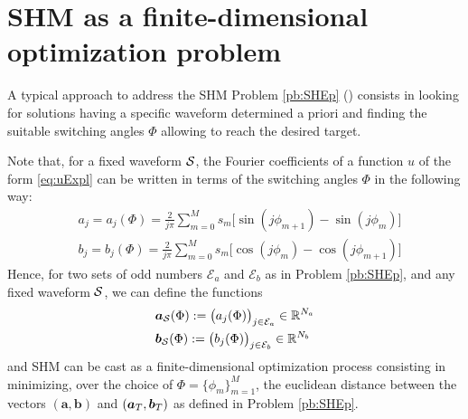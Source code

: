 \documentclass[twocolumn]{autart}    %
\begin{document}
\section{SHM as a finite-dimensional optimization problem}\label{sec:SHE_finite-dim_pbm}

A typical approach to address the SHM Problem \ref{pb:SHEp} (\cite{Yang2015,Konstantinou2010,Sun1996}) consists in looking for solutions having a specific waveform determined a priori and finding the suitable switching angles $\Phi$ allowing to reach the desired target. 

Note that, for a fixed waveform $\mathcal{S}$, the Fourier coefficients of a function $u$ of the form \eqref{eq:uExpl} can be written in terms of the switching angles $\Phi$ in the following way:
\begin{align*}
	& a_j = a_j(\Phi) =  \frac{2}{j\pi} \sum_{m=0}^{M} s_m \Big[\sin(j\phi_{m+1}) -\sin(j\phi_{m})\Big]
	\\[5pt]
	& b_j = b_j(\Phi) = \frac{2}{j\pi} \sum_{m=0}^{M} s_m \Big[\cos(j\phi_{m}) -\cos(j\phi_{m+1})\Big]
\end{align*}
Hence, for two sets of odd numbers $\mathcal{E}_a$ and $\mathcal{E}_b$ as in Problem \ref{pb:SHEp}, and any fixed waveform $\mathcal{S}$, we can define the functions
\begin{align*}
	&\bm{a}_{\mathcal{S}} (\Phi) := \big(a_j (\Phi)\big)_{j\in \mathcal{E}_a} \in \mathbb{R}^{N_a}
	\\
	&\bm{b}_{\mathcal{S}} (\Phi) := \big(b_j (\Phi)\big)_{j\in \mathcal{E}_b} \in \mathbb{R}^{N_b}
\end{align*}
and SHM can be cast as a finite-dimensional optimization process consisting in minimizing, over the choice of $\Phi = \{\phi_m\}_{m=1}^{M}$, the euclidean distance between the vectors $(\bm{a},\bm{b})$ and $(\bm{a}_T,\bm{b}_T)$ as defined in Problem \ref{pb:SHEp}.

\bigskip
\end{document}
